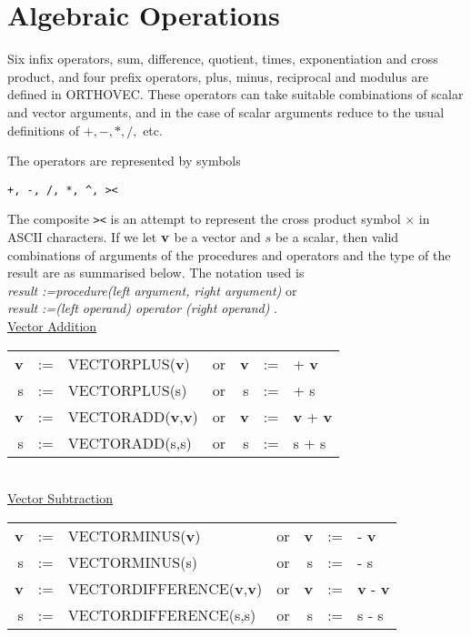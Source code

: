 \section{Algebraic Operations}

Six infix operators, sum, difference, quotient, times, exponentiation
and cross product, and four prefix
operators, plus, minus, reciprocal
and  modulus are defined in ORTHOVEC.  These operators can take suitable
combinations of scalar and vector arguments,
and in the case of scalar arguments reduce to the usual definitions of
$ +, -, *, /, $ etc.

The operators are represented by symbols
  
  
\begin{verbatim}
+, -, /, *, ^, ><
\end{verbatim}

 The composite {\tt ><} is an
attempt to represent the cross product symbol
$\times$ in ASCII characters.
If we let ${\bf v}$ be a vector and $s$ be a scalar, then
valid combinations of arguments of the
procedures and operators and the type of the result
are as summarised below.  The notation used is\\
{\em result :=procedure(left argument, right argument) } or\\
{\em result :=(left operand) operator (right operand) } . \\

\newpage
\underline{Vector Addition} \\
  
\begin{tabular}{rclcrcl}
{\bf v} &:=& VECTORPLUS({\bf v})  &{\rm or}& {\bf v} &:=&  +  {\bf v} \\
     s  &:=& VECTORPLUS(s)  &{\rm or} &      s  &:=&  +       s  \\
{\bf v} &:=& VECTORADD({\bf v},{\bf v})  &{\rm or }& {\bf v} &:=&
{\bf v} +  {\bf v} \\
     s  &:=& VECTORADD(s,s)  &{\rm or }&      s  &:=&  s + s \\
\end{tabular} \\

\underline{Vector Subtraction} \\
  
\begin{tabular}{rclcrcl}
{\bf v} &:=& VECTORMINUS({\bf v})  &{\rm or}&
 {\bf v} &:=&  -  {\bf v} \\
 s  &:=& VECTORMINUS(s)  &{\rm or} &      s  &:=&  -       s  \\
{\bf v} &:=& VECTORDIFFERENCE({\bf v},{\bf v})  &{\rm or }& {\bf v} &:=&
  {\bf v} -  {\bf v} \\
 s  &:=& VECTORDIFFERENCE(s,s)  &{\rm or }&      s  &:=&  s - s \\
\end{tabular} \\

